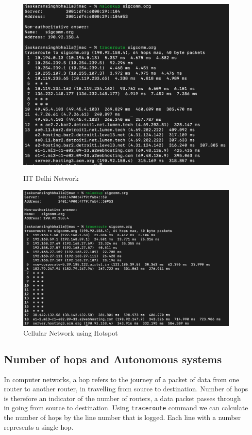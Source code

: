 \documentclass{article}
\begin{document}
\begin{figure}[H]
    \centering
    \begin{minipage}{0.45\textwidth}
        \centering
        \includegraphics[width=\linewidth]{part-1/traceroute-iitd-sigcomm.png}
        \caption{IIT Delhi Network}
    \end{minipage}
    \hfill
    \begin{minipage}{0.45\textwidth}
        \centering
        \includegraphics[width=\linewidth]{part-1/traceroute-celluar-sigcomm.png}
        \caption{Cellular Network using Hotspot}
    \end{minipage}
\end{figure}

\subsection{Number of hops and Autonomous systems}
\noindent
In computer networks, a hop refers to the journey of a packet of data from one router to another router, in travelling from source to destination. Number of hops is therefore an indicator of the number of routers, a data packet passes through in going from source to destination. Using \verb|traceroute| command we can calculate the number of hops by the line number that is logged. Each line with a number represents a single hop.
\end{document}
